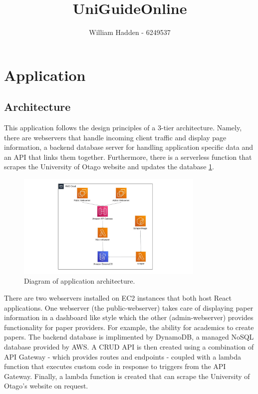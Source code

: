 \documentclass[12pt]{article}
\begin{document}
\title{UniGuideOnline \\ }

\author{William Hadden - 6249537} 

\maketitle

\section{Application}
\subsection{Architecture}

This application follows the design principles of a 3-tier architecture. Namely, there are webservers that handle incoming client traffic and display page information, a backend database server for handling application specific data and an API that links them together. Furthermore, there is a serverless function that scrapes the University of Otago website and updates the database \ref{fig: application_architecutre}.

\begin{figure}[h!]
    \caption{Diagram of application architecture.}
    \label{fig: application_architecutre}
    \begin{center}
        \includegraphics[width=0.8\textwidth]{../docs-assets/AWS_architecture.jpg}
    \end{center} 
\end{figure}

There are two webservers installed on EC2 instances that both host React applications. One webserver (the public-webserver) takes care of displaying paper information in a dashboard like style which the other (admin-webserver) provides functionality for paper providers. For example, the ability for academics to create papers. The backend database is implimented by DynamoDB, a managed NoSQL database provided by AWS. A CRUD API is then created using a combination of API Gateway - which provides routes and endpoints - coupled with a lambda function that executes custom code in response to triggers from the API Gateway. Finally, a lambda function is created that can scrape the University of Otago's website on request.
\end{document}
